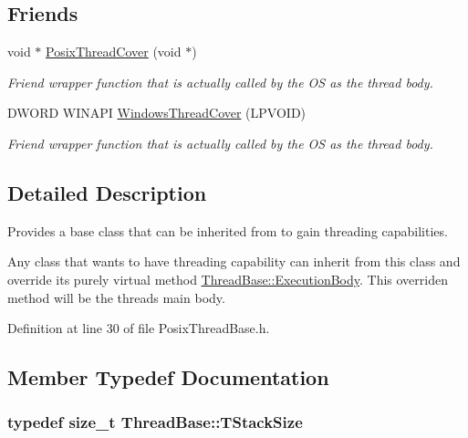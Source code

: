 \subsection*{Friends}
\begin{DoxyCompactItemize}
\item 
void $\ast$ \hyperlink{class_thread_base_a2567acd55e8bbdbf8ac90a8f77bb4943}{Posix\-Thread\-Cover} (void $\ast$)
\begin{DoxyCompactList}\small\item\em Friend wrapper function that is actually called by the O\-S as the thread body. \end{DoxyCompactList}\item 
D\-W\-O\-R\-D W\-I\-N\-A\-P\-I \hyperlink{class_thread_base_a790b21ad102d0b813d14e54f4fbf4460}{Windows\-Thread\-Cover} (L\-P\-V\-O\-I\-D)
\begin{DoxyCompactList}\small\item\em Friend wrapper function that is actually called by the O\-S as the thread body. \end{DoxyCompactList}\end{DoxyCompactItemize}


\subsection{Detailed Description}
Provides a base class that can be inherited from to gain threading capabilities. 

Any class that wants to have threading capability can inherit from this class and override its purely virtual method \hyperlink{class_thread_base_a9904309fcfb4dce33130ef1f1a1c227e}{Thread\-Base\-::\-Execution\-Body}. This overriden method will be the threads main body. 

Definition at line 30 of file Posix\-Thread\-Base.\-h.



\subsection{Member Typedef Documentation}
\hypertarget{class_thread_base_af45bd74387b409e15989f7eddbaf3718}{
\subsubsection[{T\-Stack\-Size}]{\setlength{\rightskip}{0pt plus 5cm}typedef size\-\_\-t {\bf Thread\-Base\-::\-T\-Stack\-Size}}}\label{class_thread_base_af45bd74387b409e15989f7eddbaf3718}


